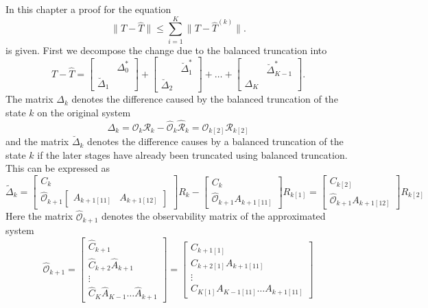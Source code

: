 \documentclass[doctype=mastersthesis,BCOR=15mm,biblatex]{ldvbook}%
\newcommand{\R}{\mathcal{R}} %
\newcommand{\Ob}{\mathcal{O}} %
\begin{document}
In this chapter a proof for the equation
\begin{equation}
\|T-\hat{T}\| \leq \sum_{i=1}^K \|T-\hat{T}^{(k)}\| .
\end{equation}
is given.
First we decompose the change due to the balanced truncation into
\begin{equation}
	T-\hat{T} =
	\begin{bmatrix}
	&\Delta_0^*\\
	\breve{\Delta}_1
	\end{bmatrix}
	+
	\begin{bmatrix}
	&\breve{\Delta}_1^*\\
	\breve{\Delta}_2
	\end{bmatrix}
	+\dots+
	\begin{bmatrix}
	&\breve{\Delta}_{K-1}^*\\
	\Delta_K
	\end{bmatrix}
	.
\end{equation}
The matrix $\Delta_k$ denotes the difference caused by the balanced truncation of the state $k$ on the original system
\begin{equation}
	\Delta_k = \Ob_{k}\R_{k} - \hat{\Ob}_k\hat{\R}_k = \Ob_{k[2]}\R_{k[2]}
\end{equation}
and the matrix $\breve{\Delta}_k$ denotes the difference causes by a balanced truncation of the state $k$ if the later stages have already been truncated using balanced truncation. This can be  expressed as 
\begin{equation*}
\tilde{\Delta}_k=
	\begin{bmatrix}
	C_k\\
	\hat{\Ob}_{k+1}\begin{bmatrix}
	A_{k+1[11]}&A_{k+1[12]}
	\end{bmatrix}
	\end{bmatrix}
	R_k
	-
	\begin{bmatrix}
C_k\\
\hat{\Ob}_{k+1}
A_{k+1[11]}
\end{bmatrix}
R_{k[1]}
= 
\begin{bmatrix}
C_{k[2]}\\
\hat{\Ob}_{k+1}A_{k+1[12]}
\end{bmatrix}
R_{k[2]}
\end{equation*}
Here the matrix $\hat{\Ob}_{k+1}$ denotes the observability matrix of the approximated system 
\begin{equation}
\hat{\Ob}_{k+1}=
\begin{bmatrix}
\hat{C}_{k+1}\\
\hat{C}_{k+2}\hat{A}_{k+1}\\
\vdots \\
\hat{C}_{K} \hat{A}_{K-1} \dots \hat{A}_{k+1}
\end{bmatrix}
=
\begin{bmatrix}
C_{k+1[1]}\\
C_{k+2[1]}A_{k+1[11]}\\
\vdots\\
C_{K[1]}A_{K-1[11]}\dots A_{k+1[11]}
\end{bmatrix}
\end{equation}
\end{document}
